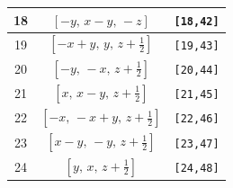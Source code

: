 \documentclass[fleqn,8pt]{jsarticle}
\begin{document}
\begin{longtable}{ccc}
18 & $\left[ - y,\, x - y,\, - z \right]$ & {\tt [18,42]} \\ \hline
19 & $\left[ - x + y,\, y,\, z + \frac{1}{2} \right]$ & {\tt [19,43]} \\ \hline
20 & $\left[ - y,\, - x,\, z + \frac{1}{2} \right]$ & {\tt [20,44]} \\ \hline
21 & $\left[ x,\, x - y,\, z + \frac{1}{2} \right]$ & {\tt [21,45]} \\ \hline
22 & $\left[ - x,\, - x + y,\, z + \frac{1}{2} \right]$ & {\tt [22,46]} \\ \hline
23 & $\left[ x - y,\, - y,\, z + \frac{1}{2} \right]$ & {\tt [23,47]} \\ \hline
24 & $\left[ y,\, x,\, z + \frac{1}{2} \right]$ & {\tt [24,48]} \\
\end{longtable}
\end{document}

